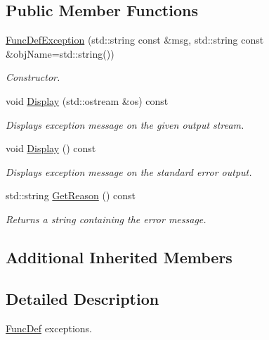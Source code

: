 \subsection*{Public Member Functions}
\begin{DoxyCompactItemize}
\item 
\hyperlink{class_common_1_1_func_def_exception_aa06c459c9c9ad9ea53b4495f03bb5e0c}{Func\-Def\-Exception} (std\-::string const \&msg, std\-::string const \&obj\-Name=std\-::string())
\begin{DoxyCompactList}\small\item\em Constructor. \end{DoxyCompactList}\item 
void \hyperlink{class_common_1_1_func_def_exception_ad9d4ee3b71921aa0d6a14bf2450897d7}{Display} (std\-::ostream \&os) const 
\begin{DoxyCompactList}\small\item\em Displays exception message on the given output stream. \end{DoxyCompactList}\item 
\hypertarget{class_common_1_1_func_def_exception_aa21acc3ca2cb91020c58668990dbd210}{void \hyperlink{class_common_1_1_func_def_exception_aa21acc3ca2cb91020c58668990dbd210}{Display} () const }\label{class_common_1_1_func_def_exception_aa21acc3ca2cb91020c58668990dbd210}

\begin{DoxyCompactList}\small\item\em Displays exception message on the standard error output. \end{DoxyCompactList}\item 
std\-::string \hyperlink{class_common_1_1_func_def_exception_a254c77c993c8ee0b286d2720b255f4b7}{Get\-Reason} () const 
\begin{DoxyCompactList}\small\item\em Returns a string containing the error message. \end{DoxyCompactList}\end{DoxyCompactItemize}
\subsection*{Additional Inherited Members}


\subsection{Detailed Description}
\hyperlink{class_common_1_1_func_def}{Func\-Def} exceptions. 

